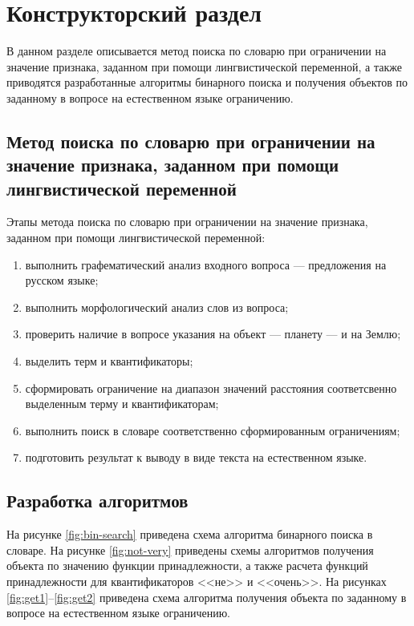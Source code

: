 \section{Конструкторский раздел \hfill}
\vspace{\baselineskip}

В данном разделе описывается метод поиска по словарю при ограничении на значение признака, заданном при помощи лингвистической переменной, а также приводятся разработанные алгоритмы бинарного поиска и получения объектов по заданному в вопросе на естественном языке ограничению.

\vspace{\baselineskip}
\subsection{Метод поиска по словарю при ограничении на значение признака, заданном при помощи лингвистической переменной}
\vspace{\baselineskip}

Этапы метода поиска по словарю при ограничении на значение признака, заданном при помощи лингвистической переменной:
\begin{enumerate}[label=\arabic*)]
\item выполнить графематический анализ входного вопроса --- предложения на русском языке;
\item выполнить морфологический анализ слов из вопроса;
\item проверить наличие в вопросе указания на объект --- планету --- и на Землю;
\item выделить терм и квантификаторы;
\item сформировать ограничение на диапазон значений расстояния соответсвенно выделенным терму и квантификаторам;
\item выполнить поиск в словаре соответственно сформированным ограничениям;
\item подготовить результат к выводу в виде текста на естественном языке.
\end{enumerate}

\vspace{\baselineskip}
\subsection{Разработка алгоритмов} 
\vspace{\baselineskip}

На рисунке \ref{fig:bin-search} приведена схема алгоритма бинарного поиска в словаре. 
На рисунке \ref{fig:not-very} приведены схемы алгоритмов получения объекта по значению функции принадлежности, а также расчета функций принадлежности для квантификаторов <<не>> и <<очень>>.
На рисунках \ref{fig:get1}--\ref{fig:get2} приведена схема алгоритма получения объекта по заданному в вопросе на естественном языке ограничению.

